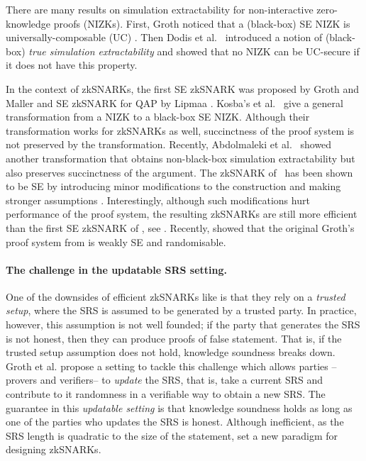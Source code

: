 There are many results on simulation extractability for
non-interactive zero-knowledge proofs (NIZKs). First, Groth \cite{AC:Groth07}
noticed that a (black-box) SE NIZK is
universally-composable (UC) 
\cite{EPRINT:Canetti00}. Then Dodis et al.~\cite{AC:DHLW10} introduced a
notion of (black-box) \emph{true simulation extractability} and showed that no
NIZK can be UC-secure if it does not have this property. 

In the context of zkSNARKs, the first
SE zkSNARK was proposed by Groth and Maller \cite{C:GroMal17} and SE
zkSNARK for QAP by Lipmaa \cite{EPRINT:Lipmaa19a}. 
Kosba's et
al.~\cite{EPRINT:KZMQCP15} give a general transformation from a NIZK to a
black-box SE NIZK. Although their transformation works for zkSNARKs as well,
succinctness of the proof system is not preserved by the transformation.
Recently, Abdolmaleki et al.~\cite{CCS:AbdRamSla20} showed another transformation that
obtains non-black-box simulation extractability but also preserves
succinctness of the argument. 
The zkSNARK of~\cite{EC:Groth16} has been shown to be SE by introducing minor modifications to the construction and making
stronger assumptions \cite{EPRINT:BowGab18,EPRINT:AtaBag19}. Interestingly,
although such modifications hurt performance of the proof system, the resulting
zkSNARKs are still more efficient than the first SE zkSNARK of \cite{C:GroMal17},
see \cite{EPRINT:AtaBag19}. Recently, \cite{EPRINT:BKSV20} showed that the
original Groth's proof system from \cite{EC:Groth16} is weakly SE and
randomisable.  

\paragraph{The challenge in the updatable SRS setting.}
One of the downsides of efficient zkSNARKs like \cite{GGPR,PGHR} is that they rely on a \textit{trusted setup}, where the SRS is assumed to be generated by a trusted party. In practice, however, this assumption is not well founded; if the party that generates the SRS is not honest, then they can produce proofs of false statement. That is, if the trusted setup assumption does not hold, knowledge soundness breaks down.
Groth et al.\cite{} propose a setting to tackle this challenge which allows parties -- provers and verifiers-- to \emph{update} the SRS, that is, take a current SRS and contribute to it randomness in a verifiable way to obtain a new SRS. The guarantee in this \textit{updatable setting} is that knowledge soundness holds as long as one of the parties who updates the SRS is honest.
Although inefficient, as the SRS length
is quadratic to the size of the statement, \cite{C:GKMMM18} set a new
paradigm for designing zkSNARKs.

